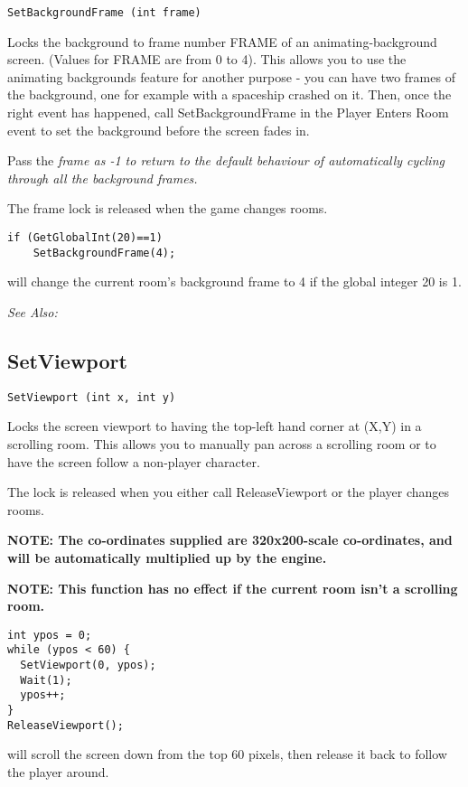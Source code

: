 \begin{verbatim}
SetBackgroundFrame (int frame)
\end{verbatim}
Locks the background to frame number FRAME of an animating-background
screen. (Values for FRAME are from 0 to 4). This allows you to use the
animating backgrounds feature for another purpose - you can have two
frames of the background, one for example with a spaceship crashed on it.
Then, once the right event has happened, call SetBackgroundFrame in the
Player Enters Room event to set the background before the screen fades in.

Pass the \it{frame} as -1 to return to the default behaviour of automatically
cycling through all the background frames.

The frame lock is released when the game changes rooms.

\begin{verbatim}
if (GetGlobalInt(20)==1)
    SetBackgroundFrame(4);
\end{verbatim}
will change the current room's background frame to 4 if the global integer 20 is 1.

\it{See Also:} 


\subsection{SetViewport}\label{SetViewport}%

\begin{verbatim}
SetViewport (int x, int y)
\end{verbatim}
Locks the screen viewport to having the top-left hand corner at (X,Y) in
a scrolling room. This allows you to manually pan across a scrolling room
or to have the screen follow a non-player character.

The lock is released when you either call ReleaseViewport or the player
changes rooms.

\bf{NOTE:} The co-ordinates supplied are 320x200-scale co-ordinates, and will
be automatically multiplied up by the engine.

\bf{NOTE:} This function has no effect if the current room isn't a scrolling room.

\begin{verbatim}
int ypos = 0;
while (ypos < 60) {
  SetViewport(0, ypos);
  Wait(1);
  ypos++;
}
ReleaseViewport();
\end{verbatim}
will scroll the screen down from the top 60 pixels, then release it back
to follow the player around.

